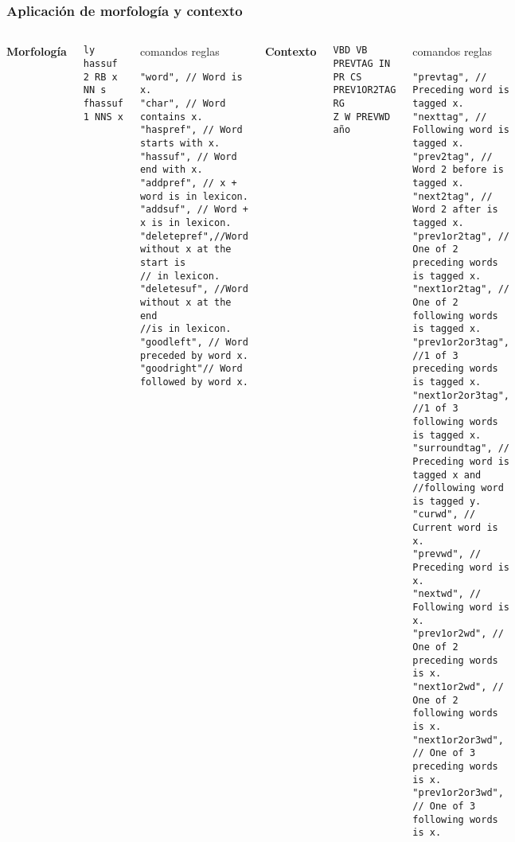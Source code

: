 \documentclass{beamer}
\begin{document}
\begin{frame}[fragile]
\frametitle{Aplicación de morfología y contexto}
\begin{columns}[t]
\textbf{Morfología}
\begin{example}
\begin{tiny}
\begin{verbatim}
ly hassuf 2 RB x
NN s fhassuf 1 NNS x
\end{verbatim}\end{tiny}
\end{example}
\begin{tiny}\begin{block}{comandos reglas}
\begin{verbatim}
"word", // Word is x.
"char", // Word contains x.
"haspref", // Word starts with x.
"hassuf", // Word end with x.
"addpref", // x + word is in lexicon.
"addsuf", // Word + x is in lexicon.
"deletepref",//Word without x at the start is
// in lexicon.
"deletesuf", //Word without x at the end 
//is in lexicon.
"goodleft", // Word preceded by word x.
"goodright"// Word followed by word x.
\end{verbatim}\end{block}\end{tiny}

\textbf{Contexto}
\begin{example}
\begin{tiny}
\begin{verbatim}
VBD VB PREVTAG IN
PR CS PREV1OR2TAG RG
Z W PREVWD año
\end{verbatim}\end{tiny}
\end{example}
\begin{tiny}\begin{block}{comandos reglas}
\begin{verbatim}
"prevtag", // Preceding word is tagged x.
"nexttag", // Following word is tagged x.
"prev2tag", // Word 2 before is tagged x.
"next2tag", // Word 2 after is tagged x.
"prev1or2tag", // One of 2 preceding words is tagged x.
"next1or2tag", // One of 2 following words is tagged x.
"prev1or2or3tag", //1 of 3 preceding words is tagged x.
"next1or2or3tag", //1 of 3 following words is tagged x.
"surroundtag", // Preceding word is tagged x and 
//following word is tagged y.
"curwd", // Current word is x.
"prevwd", // Preceding word is x.
"nextwd", // Following word is x.
"prev1or2wd", // One of 2 preceding words is x.
"next1or2wd", // One of 2 following words is x.
"next1or2or3wd", // One of 3 preceding words is x.
"prev1or2or3wd", // One of 3 following words is x.
\end{verbatim}\end{block}\end{tiny}
\end{columns}
\end{frame}
\end{document}
